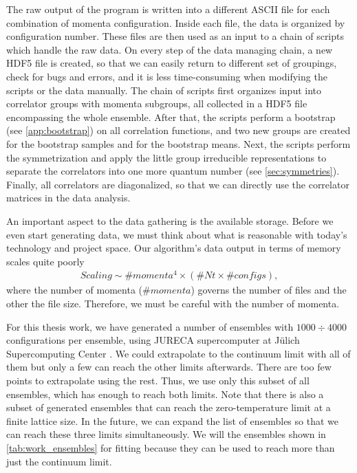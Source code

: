 The raw output of the program is written into a different ASCII file for each combination of momenta configuration. Inside each file, the data is organized by configuration number. These files are then used as an input to a chain of scripts which handle the raw data. On every step of the data managing chain, a new HDF5 file is created, so that we can easily return to different set of groupings, check for bugs and errors, and it is less time-consuming when modifying the scripts or the data manually. The chain of scripts first organizes input into correlator groups with momenta subgroups, all collected in a HDF5 file encompassing the whole ensemble. After that, the scripts perform a bootstrap (see \cref{app:bootstrap}) on all correlation functions, and two new groups are created for the bootstrap samples and for the bootstrap means. Next, the scripts perform the symmetrization and apply the little group irreducible representations to separate the correlators into one more quantum number (see \cref{sec:symmetries}). Finally, all correlators are diagonalized, so that we can directly use the correlator matrices in the data analysis.

An important aspect to the data gathering is the available storage. Before we even start generating data, we must think about what is reasonable with today's technology and project space. Our algorithm's data output in terms of memory scales quite poorly
\begin{equation}
    \begin{aligned}
        Scaling \sim \#momenta^{4} \times \left( \#Nt \times \#configs \right),
    \end{aligned}
\end{equation}
where the number of momenta ($\#momenta$) governs the number of files and the other the file size. Therefore, we must be careful with the number of momenta.

For this thesis work, we have generated a number of ensembles with $1000 \div  4000$ configurations per ensemble, using JURECA supercomputer at Jülich Supercomputing Center . We could extrapolate to the continuum limit with all of them but only a few can reach the other limits afterwards. There are too few points to extrapolate using the rest. Thus, we use only this subset of all ensembles, which has enough to reach both limits. Note that there is also a subset of generated ensembles that can reach the zero-temperature limit at a finite lattice size. In the future, we can expand the list of ensembles so that we can reach these three limits simultaneously. We will the ensembles shown in \cref{tab:work_ensembles} for fitting because they can be used to reach more than just the continuum limit.

